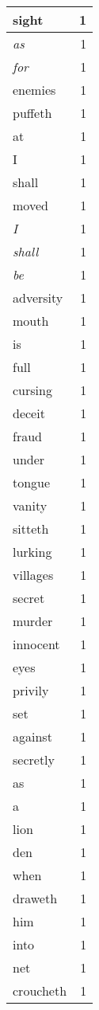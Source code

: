 \begin{center}
\begin{longtable}{l|r}
sight & 1 \\ \hline
\emph{as} & 1 \\ \hline
\emph{for} & 1 \\ \hline
enemies & 1 \\ \hline
puffeth & 1 \\ \hline
at & 1 \\ \hline
I & 1 \\ \hline
shall & 1 \\ \hline
moved & 1 \\ \hline
\emph{I} & 1 \\ \hline
\emph{shall} & 1 \\ \hline
\emph{be} & 1 \\ \hline
adversity & 1 \\ \hline
mouth & 1 \\ \hline
is & 1 \\ \hline
full & 1 \\ \hline
cursing & 1 \\ \hline
deceit & 1 \\ \hline
fraud & 1 \\ \hline
under & 1 \\ \hline
tongue & 1 \\ \hline
vanity & 1 \\ \hline
sitteth & 1 \\ \hline
lurking & 1 \\ \hline
villages & 1 \\ \hline
secret & 1 \\ \hline
murder & 1 \\ \hline
innocent & 1 \\ \hline
eyes & 1 \\ \hline
privily & 1 \\ \hline
set & 1 \\ \hline
against & 1 \\ \hline
secretly & 1 \\ \hline
as & 1 \\ \hline
a & 1 \\ \hline
lion & 1 \\ \hline
den & 1 \\ \hline
when & 1 \\ \hline
draweth & 1 \\ \hline
him & 1 \\ \hline
into & 1 \\ \hline
net & 1 \\ \hline
croucheth & 1 \\ \hline

\end{longtable}
\end{center}
